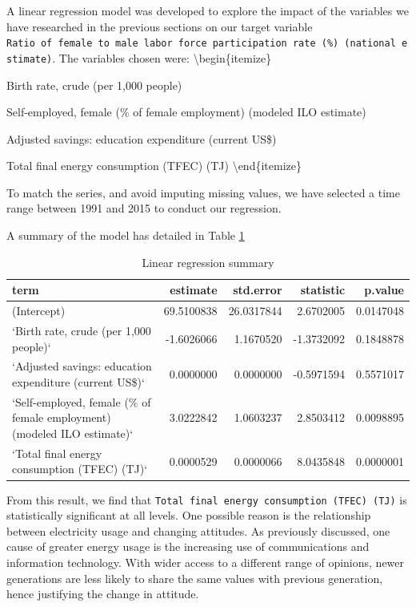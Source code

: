 \documentclass[11pt,a4paper,]{article}
\begin{document}
A linear regression model was developed to explore the impact of the variables we have researched in the previous sections on our target variable \texttt{Ratio\ of\ female\ to\ male\ labor\ force\ participation\ rate\ (\%)\ (national\ estimate)}. The variables chosen were:
\textbackslash{}begin\{itemize\}

\item

Birth rate, crude (per 1,000 people)

\item

Self-employed, female (\% of female employment) (modeled ILO estimate)

\item

Adjusted savings: education expenditure (current US\$)

\item

Total final energy consumption (TFEC) (TJ)
\textbackslash{}end\{itemize\}

To match the series, and avoid imputing missing values, we have selected a time range between 1991 and 2015 to conduct our regression.

A summary of the model has detailed in Table \ref{tab:model-summary}

\begin{table}[!h]

\caption{\label{tab:model-summary}Linear regression summary}
\centering
\fontsize{10}{12}\selectfont
\begin{tabular}[t]{lrrrr}
\toprule
term & estimate & std.error & statistic & p.value\\
\midrule
(Intercept) & 69.5100838 & 26.0317844 & 2.6702005 & 0.0147048\\
`Birth rate, crude (per 1,000 people)` & -1.6026066 & 1.1670520 & -1.3732092 & 0.1848878\\
`Adjusted savings: education expenditure (current US\$)` & 0.0000000 & 0.0000000 & -0.5971594 & 0.5571017\\
`Self-employed, female (\% of female employment) (modeled ILO estimate)` & 3.0222842 & 1.0603237 & 2.8503412 & 0.0098895\\
`Total final energy consumption (TFEC) (TJ)` & 0.0000529 & 0.0000066 & 8.0435848 & 0.0000001\\
\bottomrule
\end{tabular}
\end{table}

From this result, we find that \texttt{Total\ final\ energy\ consumption\ (TFEC)\ (TJ)} is statistically significant at all levels. One possible reason is the relationship between electricity usage and changing attitudes. As previously discussed, one cause of greater energy usage is the increasing use of communications and information technology. With wider access to a different range of opinions, newer generations are less likely to share the same values with previous generation, hence justifying the change in attitude.
\end{document}
